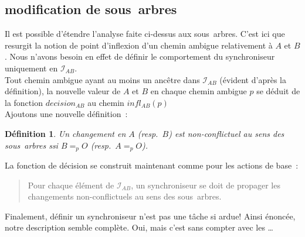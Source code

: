 \documentclass[11pt]{report}
\newtheorem{defi}{D\'efinition}
\begin{document}
{\subsection{modification de sous~arbres}
Il est possible d'\'etendre l'analyse faite ci-dessus aux sous~arbres. 
C'est ici que resurgit la notion de point d'inflexion d'un chemin ambigue 
relativement \`a $A$ et $B$. Nous n'avons besoin en effet de d\'efinir le 
comportement du synchroniseur uniquement en $\mathcal{I}_{AB}$.\\
Tout chemin ambigue ayant au moins un anc\^etre dans $\mathcal{I}_{AB}$
(\'evident d'apr\`es la d\'efinition), la nouvelle valeur de $A$ et $B$ en chaque 
chemin ambigue $p$ se d\'eduit de la fonction $decision_{AB}$ au chemin
$infl_{AB}(p)$\\
Ajoutons une nouvelle d\'efinition~:
\begin{defi}
Un changement en $A$ (resp.\ $B$) est non-conflictuel au sens des sous~arbres ssi 
$B =_{p} O$ (resp.\ $A =_{p} O$). 
\end{defi}
La fonction de d\'ecision se construit maintenant comme pour les actions de base~:
\begin{quote}
Pour chaque \'el\'ement de $\mathcal{I}_{AB}$, un synchroniseur se doit de 
propager les changements non-conflictuels au sens des sous~arbres.
\end{quote}
Finalement, d\'efinir un synchroniseur n'est pas une t\^ache si ardue! Ainsi
\'enonc\'ee, notre description semble compl\`ete. Oui, mais c'est sans compter
avec les \ldots
}
\end{document}
